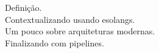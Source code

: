 \documentclass[preview]{standalone}
\begin{document}
Definição.\\Contextualizando usando esolangs.\\Um pouco sobre arquiteturas modernas.\\Finalizando com pipelines.\\
\end{document}
